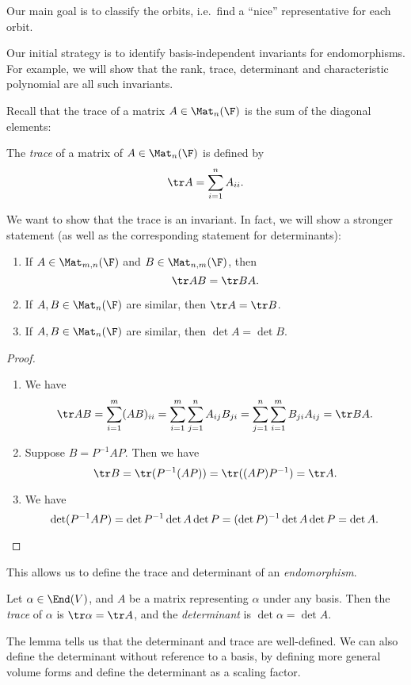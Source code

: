\documentclass[a4paper]{article}
\begin{document}
Our main goal is to classify the orbits, i.e.\ find a ``nice'' representative for each orbit.

Our initial strategy is to identify basis-independent invariants for endomorphisms. For example, we will show that the rank, trace, determinant and characteristic polynomial are all such invariants.

Recall that the trace of a matrix $A \in \Mat_n(\F)$ is the sum of the diagonal elements:
\begin{defi}[Trace]
  The \emph{trace} of a matrix of $A \in \Mat_n(\F)$ is defined by
  \[
    \tr A = \sum_{i = 1}^n A_{ii}.
  \]
\end{defi}

We want to show that the trace is an invariant. In fact, we will show a stronger statement (as well as the corresponding statement for determinants):
\begin{lemma}\leavevmode
  \begin{enumerate}
    \item If $A \in \Mat_{m, n}(\F)$ and $B\in \Mat_{n, m}(\F)$, then
      \[
        \tr AB = \tr BA.
      \]
    \item If $A, B \in \Mat_n(\F)$ are similar, then $\tr A = \tr B$.
    \item If $A, B \in \Mat_n(\F)$ are similar, then $\det A = \det B$.
  \end{enumerate}
\end{lemma}

\begin{proof}\leavevmode
  \begin{enumerate}
    \item We have
      \[
        \tr AB = \sum_{i = 1}^m (AB)_{ii} = \sum_{i = 1}^m \sum_{j = 1}^n A_{ij}B_{ji} = \sum_{j = 1}^n \sum_{i = 1}^m B_{ji}A_{ij} = \tr BA.
      \]
    \item Suppose $B = P^{-1}AP$. Then we have
      \[
        \tr B = \tr (P^{-1}(AP)) = \tr ((AP)P^{-1}) = \tr A.
      \]
    \item We have
      \[
        \det (P^{-1}AP) = \det P^{-1} \det A \det P = (\det P)^{-1} \det A \det P = \det A.\qedhere
      \]%
  \end{enumerate}
\end{proof}
This allows us to define the trace and determinant of an \emph{endomorphism}.
\begin{defi}
  Let $\alpha \in \End(V)$, and $A$ be a matrix representing $\alpha$ under any basis. Then the \emph{trace} of $\alpha$ is $\tr \alpha = \tr A$, and the \emph{determinant} is $\det \alpha = \det A$.
\end{defi}
The lemma tells us that the determinant and trace are well-defined. We can also define the determinant without reference to a basis, by defining more general volume forms and define the determinant as a scaling factor.
\end{document}
